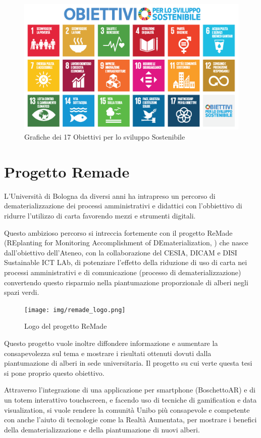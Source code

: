 \begin{figure}[h]
    \centering
    \includegraphics[width=\textwidth]{img/SDG_Poster.png}
    \caption{Grafiche dei 17 Obiettivi per lo sviluppo Sostenibile}
    \label{fig:sdgs}
\end{figure}
%
%
\section{Progetto Remade}
L'Università di Bologna da diversi anni ha intrapreso un percorso di dematerializzazione dei processi amministrativi e didattici con l'obbiettivo di ridurre l'utilizzo di carta favorendo mezzi e strumenti digitali.

Questo ambizioso percorso si intreccia fortemente con il progetto ReMade (REplanting for Monitoring Accomplishment of DEmaterialization, \cite{remade_project}) che nasce dall'obiettivo dell'Ateneo, con la collaborazione del CESIA, DICAM e DISI Sustainable ICT LAb, di potenziare l'effetto della riduzione di uso di carta nei processi amministrativi e di comunicazione (processo di dematerializzazione) convertendo questo risparmio nella piantumazione proporzionale di alberi negli spazi verdi.
\begin{figure}[h]
    \center
    \texttt{[image: img/remade\_logo.png]}
    \caption{Logo del progetto ReMade}
    \label{fig:remade_logo}
\end{figure}

Questo progetto vuole inoltre diffondere informazione e aumentare la consapevolezza sul tema e mostrare i risultati ottenuti dovuti dalla piantumazione di alberi in sede universitaria. Il progetto su cui verte questa tesi si pone proprio questo obiettivo.

Attraverso l'integrazione di una applicazione per smartphone (BoschettoAR) e di un totem interattivo touchscreen, e facendo uso di tecniche di gamification e data visualization, si vuole rendere la comunità Unibo più consapevole e competente con anche l'aiuto di tecnologie come la Realtà Aumentata, per mostrare i benefici della dematerializzazione e della piantumazione di nuovi alberi.

